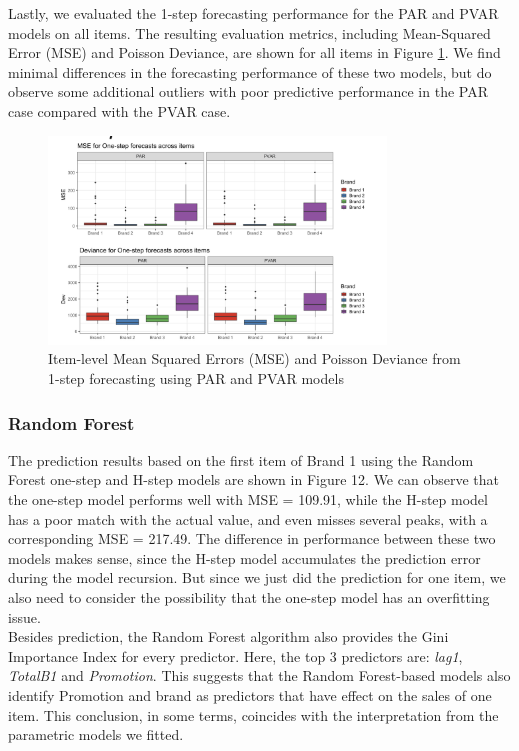 \documentclass{article}
\begin{document}
\noindent Lastly, we evaluated the 1-step forecasting performance for the PAR and PVAR models on all items. The resulting evaluation metrics, including Mean-Squared Error (MSE) and Poisson Deviance, are shown for all items in Figure \ref{fig:par_forecast_eval}. We find minimal differences in the forecasting performance of these two models, but do observe some additional outliers with poor predictive performance in the PAR case compared with the PVAR case. 

\vspace{2cm}

\begin{figure}[ht]
\centering
\includegraphics[width=0.8\textwidth]{figures/par_forecast_mse_dev.png}
\caption{Item-level Mean Squared Errors (MSE) and Poisson Deviance from 1-step forecasting using PAR and PVAR models}
\label{fig:par_forecast_eval}
\end{figure}


\subsubsection{Random Forest}
The prediction results based on the first item of Brand 1 using the Random Forest one-step and H-step models are shown in Figure 12. We can observe that the one-step model performs well with MSE = 109.91, while the H-step model has a poor match with the actual value, and even misses several peaks, with a corresponding MSE = 217.49. The difference in performance between these two models makes sense, since the H-step model accumulates the prediction error during the model recursion. But since we just did the prediction for one item, we also need to consider the possibility that the one-step model has an overfitting issue. \\

\noindent Besides prediction, the Random Forest algorithm also provides the Gini Importance Index for every predictor. Here, the top 3 predictors are: \textit{lag1}, \textit{TotalB1} and \textit{Promotion}. This suggests that the Random Forest-based models also identify Promotion and brand as predictors that have effect on the sales of one item. This conclusion, in some terms, coincides with the interpretation from the parametric models we fitted.
\end{document}
